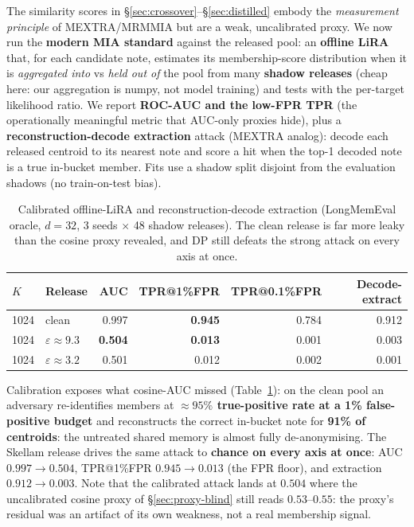 \documentclass[pdflatex,sn-mathphys-num,iicol]{sn-jnl}
\theoremstyle{thmstyleone}%
\theoremstyle{thmstyletwo}%
\theoremstyle{thmstylethree}%
\newcommand{\eps}{\varepsilon}
\newcommand{\secref}[1]{\S\ref{#1}}
\begin{document}
The similarity scores in \secref{sec:crossover}--\secref{sec:distilled} embody the
\emph{measurement principle} of MEXTRA/MRMMIA but are a weak, uncalibrated proxy. We now run
the \textbf{modern MIA standard} against the released pool: an \textbf{offline LiRA} that, for
each candidate note, estimates its membership-score distribution when it is \emph{aggregated
into} vs \emph{held out of} the pool from many \textbf{shadow releases} (cheap here: our
aggregation is numpy, not model training) and tests with the per-target likelihood ratio. We
report \textbf{ROC-AUC and the low-FPR TPR} (the operationally meaningful metric that AUC-only
proxies hide), plus a \textbf{reconstruction-decode extraction} attack (MEXTRA analog): decode
each released centroid to its nearest note and score a hit when the top-1 decoded note is a
true in-bucket member. Fits use a shadow split disjoint from the evaluation shadows (no
train-on-test bias).

\begin{table}[t]
  \centering
  \caption{Calibrated offline-LiRA and reconstruction-decode extraction (LongMemEval oracle,
  $d = 32$, 3 seeds $\times$ 48 shadow releases). The clean release is far more leaky than the
  cosine proxy revealed, and DP still defeats the strong attack on every axis at once.}
  \label{tab:lira}
  \begin{tabular}{@{}llrrrr@{}}
    \toprule
    $K$ & Release & AUC & TPR@1\%FPR & TPR@0.1\%FPR & Decode-extract \\
    \midrule
    1024 & clean               & 0.997          & \textbf{0.945} & 0.784 & 0.912 \\
    1024 & $\eps \approx 9.3$  & \textbf{0.504} & \textbf{0.013} & 0.001 & 0.003 \\
    1024 & $\eps \approx 3.2$  & 0.501          & 0.012          & 0.002 & 0.001 \\
    \bottomrule
  \end{tabular}
\end{table}

Calibration exposes what cosine-AUC missed (Table~\ref{tab:lira}): on the clean pool an
adversary re-identifies members at \textbf{${\approx}95\%$ true-positive rate at a 1\%
false-positive budget} and reconstructs the correct in-bucket note for \textbf{91\% of
centroids}: the untreated shared memory is almost fully de-anonymising. The Skellam release
drives the same attack to \textbf{chance on every axis at once}: AUC $0.997 \to 0.504$,
TPR@1\%FPR $0.945 \to 0.013$ (the FPR floor), and extraction $0.912 \to 0.003$. Note that the
calibrated attack lands at $0.504$ where the uncalibrated cosine proxy of
\secref{sec:proxy-blind} still reads $0.53$--$0.55$: the proxy's residual was an artifact of
its own weakness, not a real membership signal.
\end{document}

